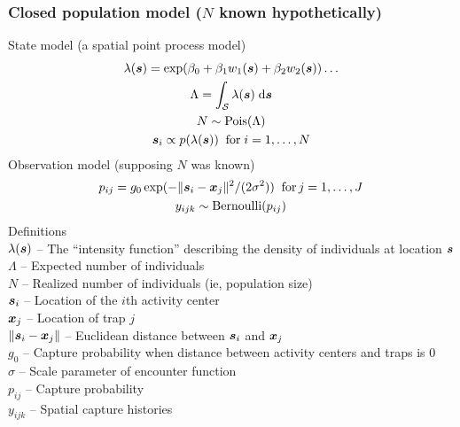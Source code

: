 \documentclass[color=usenames,dvipsnames]{beamer}\usepackage[]{graphicx}\usepackage[]{color}
\begin{document}
\begin{frame}
  \frametitle{\large Closed population model ($N$ known hypothetically) }
  \footnotesize
  State model (a spatial point process model) %
  \begin{gather*}
    \lambda({\bm s}) = \exp(\beta_0 + \beta_1 w_1({\bm s}) + \beta_2 w_2({\bm s})) \dots \\
    \Lambda = \int_{\mathcal{S}} \lambda({\bm s}) \; \mathrm{d}{\bm s} \\
    N \sim \mathrm{Pois}(\Lambda) \\
    {\bm s}_i \propto p(\lambda({\bm s})) \;\; \mathrm{for}\; i=1,\dots,N 
  \end{gather*}
  Observation model (supposing $N$ was known)
  \begin{gather*}
    p_{ij} = g_0\exp(-\|{\bm s}_i - {\bm x}_j\|^2/(2\sigma^2))  \;\; \mathrm{for}\, j=1,\dots,J  \\
    y_{ijk} \sim \mathrm{Bernoulli}(p_{ij})
  \end{gather*}
  \scriptsize
  Definitions \\
  \hangindent=0.9cm $\lambda({\bm s})$ -- The ``intensity function'' %
  describing the density of individuals at location ${\bm s}$ \\ 
  $\Lambda$ -- Expected number of individuals \\
  $N$ -- Realized number of individuals (ie, population size) \\
  ${\bm s}_i$ -- Location of the $i$th activity center \\
  ${\bm x}_j$ -- Location of trap $j$ \\
  $\|{\bm s}_i - {\bm x}_j\|$ -- Euclidean distance between ${\bm s}_i$ and ${\bm x}_j$ \\
  $g_0$ -- Capture probability when distance between activity centers
  and traps is 0 \\
  $\sigma$ -- Scale parameter of encounter function \\
  $p_{ij}$ -- Capture probability \\
  $y_{ijk}$ -- Spatial capture histories \\
\end{frame}
\end{document}
